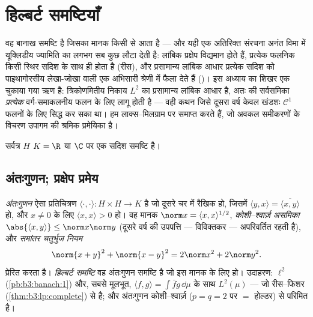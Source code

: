\chapter{हिल्बर्ट समष्टियाँ}\label{ch:b3:hilbert}

 वह बानाख समष्टि है जिसका मानक किसी  से
आता है --- और यही एक अतिरिक्त संरचना अनंत विमा में यूक्लिडीय
ज्यामिति का लगभग सब कुछ लौटा देती है: लांबिक प्रक्षेप विद्यमान
होते हैं, प्रत्येक  फलनिक किसी स्थिर सदिश के साथ  ही
होता है (रीस), और प्रसामान्य लांबिक आधार प्रत्येक सदिश को
पाइथागोरसीय लेखा-जोखा वाली एक अभिसारी श्रेणी में फैला देते हैं
()। इस अध्याय का शिखर एक चुकाया गया ऋण है: त्रिकोणमितीय
निकाय $L^2$ का प्रसामान्य लांबिक आधार है, अतः  की सर्वसमिका
\emph{प्रत्येक} वर्ग-समाकलनीय फलन के लिए लागू होती है --- वही कथन
जिसे दूसरा वर्ष केवल खंडशः $\mathcal C^1$ फलनों के लिए सिद्ध कर सका था। हम
लाक्स--मिलग्राम पर समाप्त करते हैं, जो अवकल समीकरणों के विचरण
उपागम की श्रमिक प्रमेयिका है।

सर्वत्र $H$ $K = \R$ या $\C$ पर एक सदिश समष्टि है।

\section{अंतःगुणन; प्रक्षेप प्रमेय}

\begin{definition}\label{def:b3:hilbert:inner}
\emph{अंतःगुणन} ऐसा प्रतिचित्रण $\langle
\cdot,\cdot\rangle \colon H\times H \to K$ है जो दूसरे
चर में रैखिक हो, जिसमें $\langle y, x\rangle =
\overline{\langle x, y\rangle}$ हो, और $x \neq 0$ के लिए $\langle x, x\rangle > 0$ हो। वह मानक
$\norm x = \langle x,
x\rangle^{1/2}$, \emph{कोशी--श्वार्ज़ असमिका} $\abs{\langle x, y\rangle} \leq \norm x\norm y$ (दूसरे वर्ष की उपपत्ति ---
विविक्तकर --- अपरिवर्तित रहती है), और \emph{समांतर चतुर्भुज नियम}
\[
\norm{x + y}^2 + \norm{x - y}^2 = 2\norm x^2 + 2\norm y^2 .
\]
प्रेरित करता है। \emph{हिल्बर्ट समष्टि} वह
अंतःगुणन समष्टि है जो इस मानक के लिए  हो। उदाहरण: $\ell^2$ (\cref{pb:b3:banach:1})
और, सबसे मूलभूत, $\langle f, g\rangle = \int\bar fg\,\dd\mu$ के साथ $L^2(\mu)$ --- जो रीस--फिशर (\cref{thm:b3:lp:complete}) से 
है; और अंतःगुणन कोशी--श्वार्ज़ ($p = q = 2$ पर $=$ होल्डर) से परिमित है।
\end{definition}

